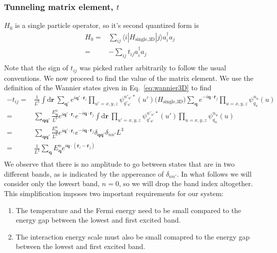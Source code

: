 \documentclass[11pt,letter]{article}
\newcommand{\bv}[1]{\ensuremath{\bm{#1}}}
\begin{document}
\subsubsection{Tunneling matrix element, $t$}
$H_{0}$ is a single particle operator, so it's second quantized form is 
\begin{equation}
\begin{split}
  H_{0} = & \sum_{ij} \langle i| H_{\text{single,3D}} |j \rangle a_{i}^{\dagger} a_{j} \\
        = & -\sum_{ij} t_{ij}  a_{i}^{\dagger} a_{j} \\
\end{split}
\end{equation}  
Note that the sign of $t_{ij}$ was picked rather arbitrarily to follow the
usual conventions.  We now proceed to find the value of the matrix element.
We use the definition of the Wannier states given in Eq.~\ref{eq:wannier3D} to
find 
\begin{equation}
\begin{split}
-t_{ij}  
= & 
  \frac{1}{L^{6}}\int \mathrm{d}\bv{r}\ 
     \sum_{\bv{q}'} e^{i \bv{q'}\cdot\bv{r}_{i} }
     \prod_{u'=x,y,z}  \psi_{q'_{u'}}^{n'_{u'}*}(u') 
  \Big( H_{\text{single,3D}}  \Big)
     \sum_{\bv{q}} e^{-i \bv{q}\cdot\bv{r}_{j} }
     \prod_{u=x,y,z}  \psi_{q_{u}}^{n_{u}}(u)\\ 
= &
  \sum_{\bv{q}\bv{q}'}   
  \frac{E_{\bv{q}}^{n}}{L^{6}}
   e^{ i \bv{q}'\cdot\bv{r}_{i} }  e^{ -i \bv{q}\cdot\bv{r}_{j} }
   \int\mathrm{d}\bv{r}\ 
     \prod_{u'=x,y,z}  \psi_{q'_{u'}}^{n'_{u'}*}(u') 
     \prod_{u=x,y,z}  \psi_{q_{u}}^{n_{u}}(u) \\ 
= &
  \sum_{\bv{q}\bv{q}'}   
  \frac{E_{\bv{q}}^{n}}{L^{6}}
   e^{ i \bv{q}'\cdot\bv{r}_{i} }  e^{ -i \bv{q}\cdot\bv{r}_{j} }
   \delta_{\bv{q}\bv{q}'} \delta_{nn'} L^{3} \\
= &
  \frac{1}{L^{3}}
  \sum_{\bv{q}}   E_{\bv{q}}^{n}
   e^{ i \bv{q}\cdot(\bv{r}_{i} - \bv{r}_{j}) } \\
\end{split} 
\end{equation}
We observe that there is no amplitude to go between states that are in two
different bands, as is indicated by the appereance of $\delta_{nn'}$.   In what
follows we will consider only the lowesrt band, $n=0$,  so we will drop the
band index altogether.  This simplification imposes two important requirements
for our system: 
\begin{enumerate}
\item The temperature and the Fermi energy need to be small compared to the energy gap between the lowest and first excited band.   
\item The interaction energy scale must also be small comapred to the energy gap between the lowest and first excited band. 
\end{enumerate}
\end{document}
